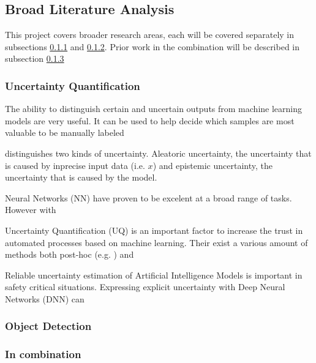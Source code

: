 \subsection{Broad Literature Analysis}\label{sec:broadliterature}

This project covers broader research areas, each will be covered separately in subsections \ref{sec:broadliterature:uncertainty} and \ref{sec:broadliterature:object_detection}. Prior work in the combination will be described in subsection \ref{sec:broadliterature:combination}

\subsubsection{Uncertainty Quantification}\label{sec:broadliterature:uncertainty}
The ability to distinguish certain and uncertain outputs from machine learning models are very useful. It can be used to help decide which samples are most valuable to be manually labeled 

\citep{gal2016uncertainty} distinguishes two kinds of uncertainty. Aleatoric uncertainty, the uncertainty that is caused by inprecise input data (i.e. $x$) and epistemic uncertainty, the uncertainty that is caused by the model.

Neural Networks (NN) have proven to be excelent at a broad range of tasks. However with

Uncertainty Quantification (UQ) is an important factor to increase the trust in automated processes based on machine learning. Their exist a various amount of methods both post-hoc (e.g. ) and



Reliable uncertainty estimation of Artificial Intelligence Models is important in safety critical situations. Expressing explicit uncertainty with Deep Neural Networks (DNN) can

\subsubsection{Object Detection}\label{sec:broadliterature:object_detection}


\subsubsection{In combination}\label{sec:broadliterature:combination}


